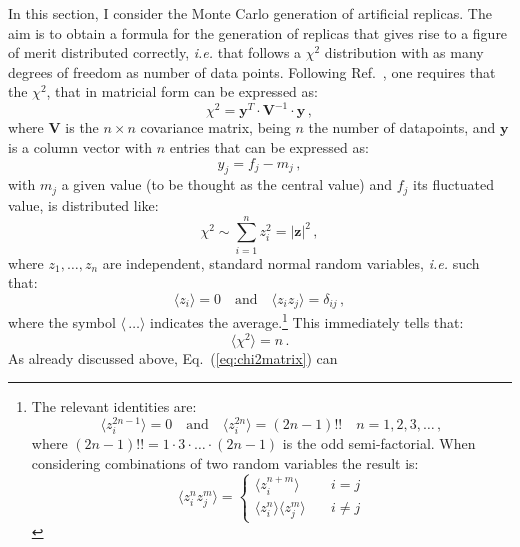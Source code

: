 \documentclass[10pt,a4paper]{article}
\begin{document}
In this section, I consider the Monte Carlo generation of artificial
replicas. The aim is to obtain a formula for the generation of
replicas that gives rise to a figure of merit distributed correctly,
\textit{i.e.} that follows a $\chi^2$ distribution with as many
degrees of freedom as number of data points. Following
Ref.~\cite{wiki:xxx}, one requires that the $\chi^2$, that in
matricial form can be expressed as:
\begin{equation}\label{eq:chi2matrix}
  \chi^2 = \mathbf{y}^{T}\cdot \mathbf{V}^{-1} \cdot \mathbf{y}\,,
\end{equation}
where $\mathbf{V}$ is the $n\times n$ covariance matrix, being $n$ the
number of datapoints, and $\mathbf{y}$ is a column vector with $n$
entries that can be expressed as:
\begin{equation}
y_j = f_j-m_j\,,
\end{equation}
with $m_j$ a given value (to be thought as the central value) and
$f_j$ its fluctuated value, is distributed like:
\begin{equation}\label{eq:wikipedia}
\chi^2\sim \sum_{i=1}^{n}z_i^2=|\mathbf{z}|^2\,,
\end{equation}
where $z_1,\dots , z_n$ are independent, standard normal random
variables, \textit{i.e.} such that:
\begin{equation}\label{eq:averages}
\langle z_i\rangle=0\quad\mbox{and}\quad \langle z_iz_j\rangle = \delta_{ij}\,,
\end{equation}
where the symbol $\langle\,\dots\rangle$ indicates the
average.\footnote{The relevant identities are:
\begin{equation}
  \langle z_i^{2n-1}\rangle = 0\quad\mbox{and}\quad \langle
  z_i^{2n}\rangle= (2n-1)!!\quad n=1,2,3,\dots\,,
\end{equation}
where $(2n-1)!!=1\cdot3\cdot\dots\cdot(2n-1)$ is the odd
semi-factorial. When considering combinations of two random variables
the result is:
\begin{equation}
  \langle z_i^n z_j^m\rangle = \left\{
\begin{array}{ll}
\langle z_i^{n+m}\rangle&\quad i = j\\
\langle z_i^n\rangle\langle z_j^m\rangle&\quad i \neq j
\end{array}
\right.
\end{equation}} This immediately tells that:
\begin{equation}
\langle\chi^2\rangle=n\,.
\end{equation}
As already discussed above, Eq.~(\ref{eq:chi2matrix}) can
\end{document}

